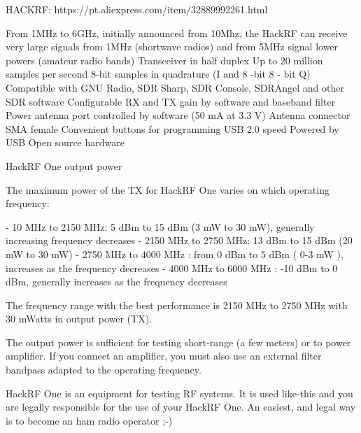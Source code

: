 \documentclass[
  12pt,				%
  openright,			%
  twoside,			%
  a4paper,			%
  english,			%
  french,				%
  spanish,			%
  brazil,				%
  ]{abntex2}
\begin{document}
HACKRF: https://pt.aliexpress.com/item/32889992261.html

From 1MHz to 6GHz, initially announced from 10Mhz, the HackRF can receive very large signals from 1MHz (shortwave radios) and from 5MHz signal lower powers (amateur radio bands)
Transceiver in half duplex
Up to 20 million samples per second
8-bit samples in quadrature (I and 8 -bit 8 - bit Q)
Compatible with GNU Radio, SDR Sharp, SDR Console, SDRAngel and other SDR software
Configurable RX and TX gain by software and baseband filter
Power antenna port controlled by software (50 mA at 3.3 V)
Antenna connector SMA female
Convenient buttons for programming
USB 2.0 speed
Powered by USB Open source hardware

HackRF One output power

The maximum power of the TX for HackRF One varies on which operating frequency:

- 10 MHz to 2150 MHz: 5 dBm to 15 dBm (3 mW to 30 mW), generally increasing frequency decreases
- 2150 MHz to 2750 MHz: 13 dBm to 15 dBm (20 mW to 30 mW)
- 2750 MHz to 4000 MHz : from 0 dBm to 5 dBm ( 0-3 mW ), increases as the frequency decreases
- 4000 MHz to 6000 MHz : -10 dBm to 0 dBm, generally increases as the frequency decreases

The frequency range with the best performance is 2150 MHz to 2750 MHz with 30 mWatts in output power (TX).

The output power is sufficient for testing short-range (a few meters) or to power amplifier. If you connect an amplifier, you must also use an external filter bandpass adapted to the operating frequency.

HackRF One is an equipment for testing RF systems. It is used like-this and you are legally responsible for the use of your HackRF One. An easiest, and legal way is to become an ham radio operator ;-)
\end{document}
